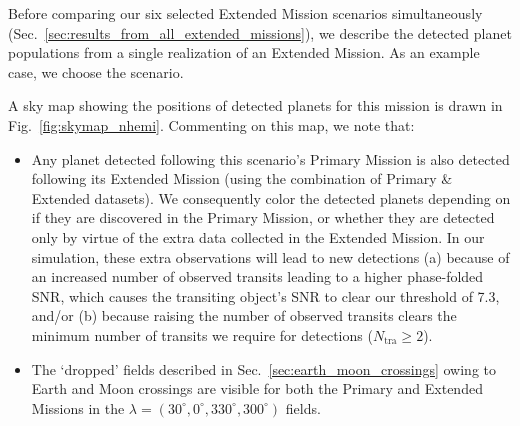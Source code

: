 Before comparing our six selected Extended Mission scenarios simultaneously (Sec.~\ref{sec:results_from_all_extended_missions}), we describe the detected planet populations from a single realization of an Extended Mission.
As an example case, we choose the \nhemi\:scenario.

A sky map showing the positions of detected planets for this mission is drawn in Fig.~\ref{fig:skymap_nhemi}.
Commenting on this map, we note that:
\begin{itemize}
	\item Any planet detected following this scenario's Primary Mission is also 
	detected following its Extended Mission (using the combination of Primary 
	\& Extended datasets).
	We consequently color the detected planets depending on if they are discovered in the Primary Mission, or whether they are detected only by virtue of the extra data collected in the Extended Mission.
	In our simulation, these extra observations will lead to new detections (a) because of an increased number of observed transits leading to a higher phase-folded SNR, which causes the transiting object's SNR to clear our threshold of 7.3, and/or (b) because raising the number of observed transits clears the minimum number of transits we require for detections ($N_\mathrm{tra} \geq 2$).
	\item The `dropped' fields described in Sec.~\ref{sec:earth_moon_crossings} owing to Earth and Moon crossings are visible for both the Primary and Extended Missions in the $\lambda=(30^\circ, 0^\circ, 330^\circ, 300^\circ)$ fields.
\end{itemize}


